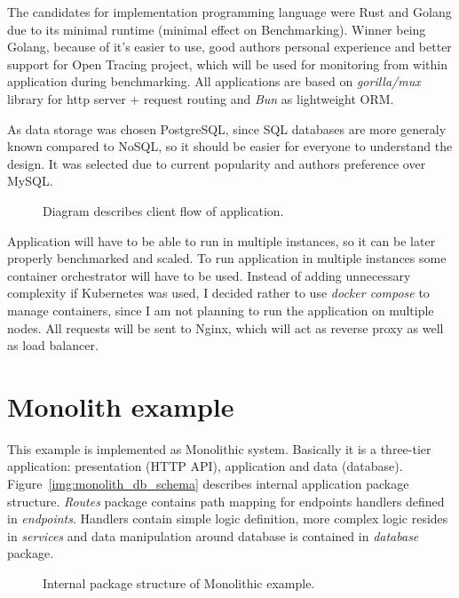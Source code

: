 The candidates for implementation programming language were Rust and Golang due to its minimal runtime (minimal effect on Benchmarking). Winner being Golang, because of it's easier to use, good authors personal experience and better support for Open Tracing project, which will be used for monitoring from within application during benchmarking. All applications are based on \textit{gorilla/mux} \cite{MUX} library for http server + request routing and \textit{Bun} \cite{BUN} as lightweight ORM.

As data storage was chosen PostgreSQL, since SQL databases are more generaly known compared to NoSQL, so it should be easier for everyone to understand the design. It was selected due to current popularity and authors preference over MySQL.
\begin{figure}
    \centering
    
    \caption{Diagram describes client flow of application. \label{img:app_activity_flow}}
\end{figure}

Application will have to be able to run in multiple instances, so it can be later properly benchmarked and scaled. To run application in multiple instances some container orchestrator will have to be used. Instead of adding unnecessary complexity if Kubernetes was used, I decided rather to use \textit{docker compose} to manage containers, since I am not planning to run the application on multiple nodes. All requests will be sent to Nginx, which will act as reverse proxy as well as load balancer.


\section{Monolith example}
This example is implemented as Monolithic system. Basically it is a three-tier application: presentation (HTTP API), application and data (database). Figure~\ref{img:monolith_db_schema} describes internal application package structure. \textit{Routes} package contains path mapping for endpoints handlers defined in \textit{endpoints}. Handlers contain simple logic definition, more complex logic resides in \textit{services} and data manipulation around database is contained in \textit{database} package.

\begin{figure}
    \centering
    
    \caption{Internal package structure of Monolithic example. \label{img:monolith_package}}
\end{figure}


